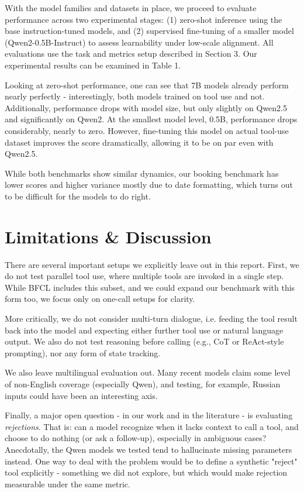 \documentclass[12pt]{extarticle}
\begin{document}
With the model families and datasets in place, we proceed to evaluate performance across two experimental stages: (1) zero-shot inference using the base instruction-tuned models, and (2) supervised fine-tuning of a smaller model (Qwen2-0.5B-Instruct) to assess learnability under low-scale alignment. All evaluations use the task and metrics setup described in Section 3. Our experimental results can be examined in Table 1.

Looking at zero-shot performance, one can see that 7B models already perform nearly perfectly - interestingly, both models trained on tool use and not. Additionally, performance drops with model size, but only slightly on Qwen2.5 and significantly on Qwen2. At the smallest model level, 0.5B, performance drops considerably, nearly to zero. However, fine-tuning this model on actual tool-use dataset improves the score dramatically, allowing it to be on par even with Qwen2.5.

While both benchmarks show similar dynamics, our booking benchmark has lower scores and higher variance mostly due to date formatting, which turns out to be difficult for the models to do right.

\section{Limitations \& Discussion}

There are several important setups we explicitly leave out in this report. First, we do not test parallel tool use, where multiple tools are invoked in a single step. While BFCL includes this subset, and we could expand our benchmark with this form too, we focus only on one-call setups for clarity.

More critically, we do not consider multi-turn dialogue, i.e. feeding the tool result back into the model and expecting either further tool use or natural language output. We also do not test reasoning before calling (e.g., CoT or ReAct-style prompting), nor any form of state tracking.

We also leave multilingual evaluation out. Many recent models claim some level of non-English coverage (especially Qwen), and testing, for example, Russian inputs could have been an interesting axis.

Finally, a major open question - in our work and in the literature - is evaluating \textit{rejections}. That is: can a model recognize when it lacks context to call a tool, and choose to do nothing (or ask a follow-up), especially in ambiguous cases? Anecdotally, the Qwen models we tested tend to hallucinate missing parameters instead. One way to deal with the problem would be to define a synthetic "reject" tool explicitly - something we did not explore, but which would make rejection measurable under the same metric.
\end{document}
